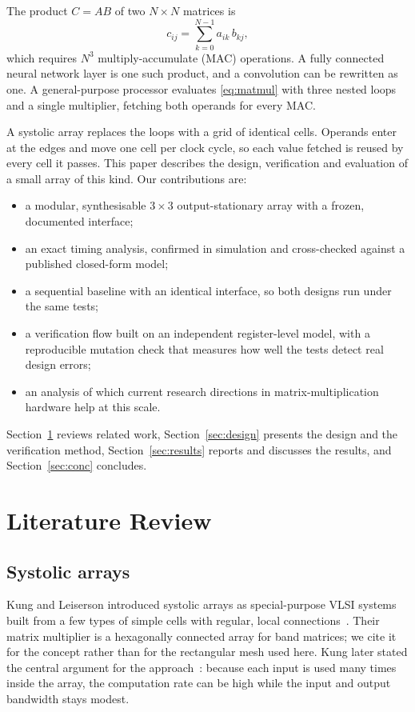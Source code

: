 \documentclass[conference]{IEEEtran}
\begin{document}
The product $C = AB$ of two $N \times N$ matrices is
\begin{equation}
c_{ij} = \sum_{k=0}^{N-1} a_{ik}\, b_{kj},
\label{eq:matmul}
\end{equation}
which requires $N^3$ multiply-accumulate (MAC) operations. A fully connected neural network layer is one such product, and a convolution can be rewritten as one. A general-purpose processor evaluates \eqref{eq:matmul} with three nested loops and a single multiplier, fetching both operands for every MAC.

A systolic array replaces the loops with a grid of identical cells. Operands enter at the edges and move one cell per clock cycle, so each value fetched is reused by every cell it passes. This paper describes the design, verification and evaluation of a small array of this kind. Our contributions are:
\begin{itemize}
\item a modular, synthesisable $3 \times 3$ output-stationary array with a frozen, documented interface;
\item an exact timing analysis, confirmed in simulation and cross-checked against a published closed-form model;
\item a sequential baseline with an identical interface, so both designs run under the same tests;
\item a verification flow built on an independent register-level model, with a reproducible mutation check that measures how well the tests detect real design errors;
\item an analysis of which current research directions in matrix-multiplication hardware help at this scale.
\end{itemize}

Section~\ref{sec:lit} reviews related work, Section~\ref{sec:design} presents the design and the verification method, Section~\ref{sec:results} reports and discusses the results, and Section~\ref{sec:conc} concludes.

\section{Literature Review}
\label{sec:lit}

\subsection{Systolic arrays}
Kung and Leiserson introduced systolic arrays as special-purpose VLSI systems built from a few types of simple cells with regular, local connections~\cite{kung1978}. Their matrix multiplier is a hexagonally connected array for band matrices; we cite it for the concept rather than for the rectangular mesh used here. Kung later stated the central argument for the approach~\cite{kung1982}: because each input is used many times inside the array, the computation rate can be high while the input and output bandwidth stays modest.
\end{document}
